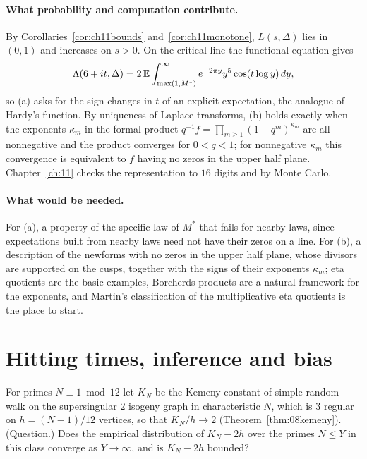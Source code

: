 \paragraph{What probability and computation contribute.} By Corollaries~\ref{cor:ch11bounds} and~\ref{cor:ch11monotone}, $L(s,\Delta)$ lies in $(0,1)$ and increases on $s>0$. On the critical line the functional equation gives
\[
\Lambda(6+it,\Delta)=2\,\mathbb{E}\int_{\max(1,M^*)}^\infty e^{-2\pi y}y^5\cos(t\log y)\,dy,
\]
so (a) asks for the sign changes in $t$ of an explicit expectation, the analogue of Hardy's function. By uniqueness of Laplace transforms, (b) holds exactly when the exponents $\kappa_m$ in the formal product $q^{-1}f=\prod_{m\ge1}(1-q^m)^{\kappa_m}$ are all nonnegative and the product converges for $0<q<1$; for nonnegative $\kappa_m$ this convergence is equivalent to $f$ having no zeros in the upper half plane. Chapter~\ref{ch:11} checks the representation to $16$ digits and by Monte Carlo.

\paragraph{What would be needed.} For (a), a property of the specific law of $M^*$ that fails for nearby laws, since expectations built from nearby laws need not have their zeros on a line. For (b), a description of the newforms with no zeros in the upper half plane, whose divisors are supported on the cusps, together with the signs of their exponents $\kappa_m$; eta quotients are the basic examples, Borcherds products are a natural framework for the exponents, and Martin's classification of the multiplicative eta quotients \cite{martin1996} is the place to start.

\section{Hitting times, inference and bias}

\begin{problem}\label{op:kemeny}
For primes $N\equiv1\bmod 12$ let $K_N$ be the Kemeny constant of simple random walk on the supersingular $2$ isogeny graph in characteristic $N$, which is $3$ regular on $h=(N-1)/12$ vertices, so that $K_N/h\to2$ (Theorem~\ref{thm:08kemeny}). (Question.) Does the empirical distribution of $K_N-2h$ over the primes $N\le Y$ in this class converge as $Y\to\infty$, and is $K_N-2h$ bounded?
\end{problem}

